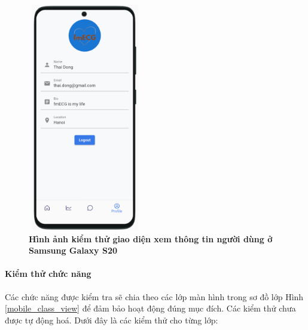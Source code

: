 \begin{figure}[H]
  \centering
  \includegraphics[width=5cm,height=10cm]{Images/mobile_app/demo/android_device_preview_user_info.png}
  \caption[Hình ảnh kiểm thử giao diện xem thông tin người dùng ở Samsung Galaxy S20]{\bfseries \fontsize{12pt}{0pt}
  \selectfont Hình ảnh kiểm thử giao diện xem thông tin người dùng ở Samsung Galaxy S20}
  \label{android_device_preview_user_info}
\end{figure}

\paragraph{Kiểm thử chức năng}
\mbox{}

Các chức năng được kiểm tra sẽ chia theo các lớp màn hình trong sơ đồ lớp Hình \ref{mobile_class_view} để đảm bảo hoạt động đúng mục đích. 
Các kiểm thử chưa được tự động hoá. 
Dưới đây là các kiểm thử cho từng lớp:

